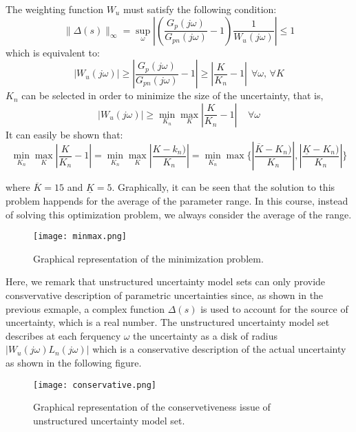 The weighting function $W_u$ must satisfy the following condition:
\[
\|\Delta(s)\|_\infty = \sup\limits_{\omega} \left| \left( \frac{G_p(j\omega)}{G_{pn}(j\omega)} - 1 \right)\frac{1}{W_u(j\omega)} \right| \leq 1
\]
which is equivalent to:
\[
|W_u(j\omega)| \geq \left| \frac{G_p(j\omega)}{G_{pn}(j\omega)} - 1 \right| \geq \left| \frac{K}{K_n} - 1 \right| \:\: \forall \omega , \, \forall K
\]
$K_n$ can be selected in order to minimize the size of the uncertainty, that is,
\[
|W_u(j\omega)| \geq \min\limits_{K_n} \max\limits_{K} \left| \frac{K}{K_n} - 1 \right| \:\:\:\:\: \forall \omega
\]
It can easily be shown that:
\[
\min\limits_{K_n} \max\limits_{K} \left| \frac{K}{K_n} - 1 \right|= \min\limits_{K_n} \max\limits_{K} \left| \frac{K-k_n)}{K_n}\right|=\min\limits_{K_n} \max\{ \left|\frac{\overline{K}-K_n)}{K_n}\right|,\left|\frac{\underline{K}-K_n)}{K_n}\right|\}
\]

where $\overline{K} = 15$ and $\underline{K} = 5$.
Graphically, it can be seen that the solution to this problem happends for the average of the parameter range. In this course, instead of solving this optimization problem, we always consider the average of the range.


\begin{figure}[H]
    \centering
    \texttt{[image: minmax.png]}
    \caption{Graphical representation of the minimization problem.}
\end{figure}

\begin{QandAbox}
Here, we remark that unstructured uncertainty model sets can only provide consvervative description of parametric uncertainties since, as shown in the previous exmaple, a complex function $\Delta(s)$ is used to account for the source of uncertainty, which is a real number. The unstructured uncertainty model set describes at each ferquency $\omega$ the uncertainty as a disk of radius $|W_u(j\omega)L_n(j\omega)|$ which is a conservative description of the actual uncertainty as shown in the following figure.
\end{QandAbox}
\begin{QandAbox}
\begin{figure}[H]
    \centering
    \texttt{[image: conservative.png]}
    \caption{Graphical representation of the conservetiveness issue of unstructured uncertainty model set.}
\end{figure}
\end{QandAbox}

